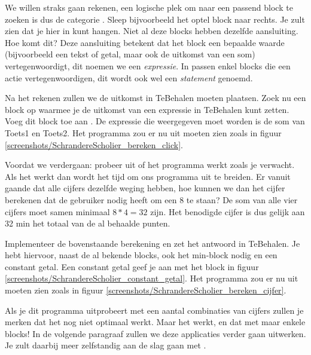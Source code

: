We willen straks gaan rekenen, een logische plek om naar een passend block te zoeken is dus de categorie . Sleep bijvoorbeeld het optel block naar rechts. Je zult zien dat je hier  in kunt hangen. Niet al deze blocks hebben dezelfde aansluiting. Hoe komt dit? Deze aansluiting betekent dat het block een bepaalde waarde (bijvoorbeeld een tekst of getal, maar ook de uitkomst van een som) vertegenwoordigt, dit noemen we een \emph{expressie}. In  passen enkel blocks die een actie vertegenwoordigen, dit wordt ook wel een \emph{statement} genoemd. 

\begin{opgave}
    \opgVraag
Na het rekenen zullen we de uitkomst in TeBehalen moeten plaatsen. Zoek nu een block op waarmee je de uitkomst van een expressie in TeBehalen kunt zetten. Voeg dit block toe aan . De expressie die weergegeven moet worden is de som van Toets1 en Toets2. 
    \opgUitwerking
    Het programma zou er nu uit moeten zien zoals in figuur \ref{screenshots/SchrandereScholier_bereken_click}.
\end{opgave}

\runOpTelefoon{} Voordat we verdergaan: probeer uit of het programma werkt zoals je verwacht. Als het werkt dan wordt het tijd om ons programma uit te breiden. Er vanuit gaande dat alle cijfers dezelfde weging hebben, hoe kunnen we dan het cijfer berekenen dat de gebruiker nodig heeft om een 8 te staan? De som van alle vier cijfers moet samen minimaal $8*4=32$ zijn. Het benodigde cijfer is dus gelijk aan 32 min het totaal van de al behaalde punten.
 
 \begin{opgave}
    \opgVraag
Implementeer de bovenstaande berekening en zet het antwoord in TeBehalen. Je hebt hiervoor, naast de al bekende blocks, ook het min-block nodig en een constant getal. Een constant getal geef je aan met het block in figuur  \ref{screenshots/SchrandereScholier_constant_getal}.
    \opgUitwerking
    Het programma zou er nu uit moeten zien zoals in figuur \ref{screenshots/SchrandereScholier_bereken_cijfer}.
\end{opgave}

\runOpTelefoon{}
Als je dit programma uitprobeert met een aantal combinaties van cijfers zullen je merken dat het nog niet optimaal werkt. Maar het werkt, en dat met maar enkele blocks! In de volgende paragraaf zullen we deze applicaties verder gaan uitwerken. Je zult daarbij meer zelfstandig aan de slag gaan met \ai.

